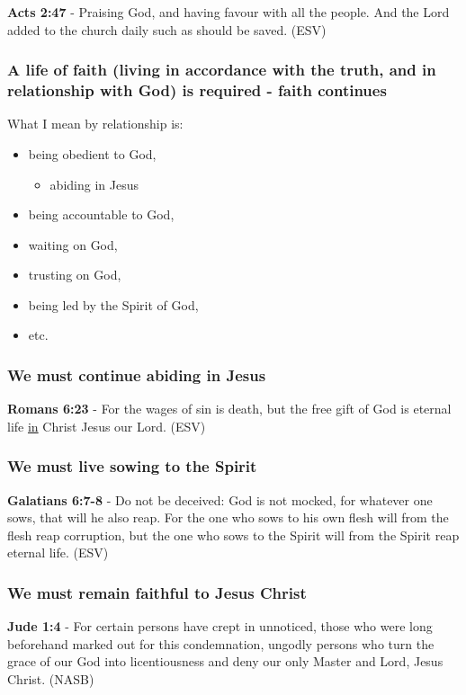 \documentclass[11pt]{article}
\begin{document}
\textbf{Acts 2:47} - Praising God, and having favour with all the people. And the Lord added to the church daily such as should be saved. (ESV)

\subsubsection{A life of faith (living in accordance with the truth, and in relationship with God) is required - faith continues}
\label{sec:orge3c6a5f}
What I mean by relationship is:
\begin{itemize}
\item being obedient to God,
\begin{itemize}
\item abiding in Jesus
\end{itemize}
\item being accountable to God,
\item waiting on God,
\item trusting on God,
\item being led by the Spirit of God,
\item etc.
\end{itemize}

\subsubsection{We must continue abiding in Jesus}
\label{sec:org93c4e34}

\textbf{Romans 6:23} - For the wages of sin is death, but the free gift of God is eternal life \uline{in} Christ Jesus our Lord. (ESV)

\subsubsection{We must live sowing to the Spirit}
\label{sec:org380f1cb}

\textbf{Galatians 6:7-8} - Do not be deceived: God is not mocked, for whatever one sows, that will he also reap. For the one who sows to his own flesh will from the flesh reap corruption, but the one who sows to the Spirit will from the Spirit reap eternal life. (ESV)

\subsubsection{We must remain faithful to Jesus Christ}
\label{sec:orgd607701}

\textbf{Jude 1:4} - For certain persons have crept in unnoticed, those who were long beforehand marked out for this condemnation, ungodly persons who turn the grace of our God into licentiousness and deny our only Master and Lord, Jesus Christ. (NASB)
\end{document}
